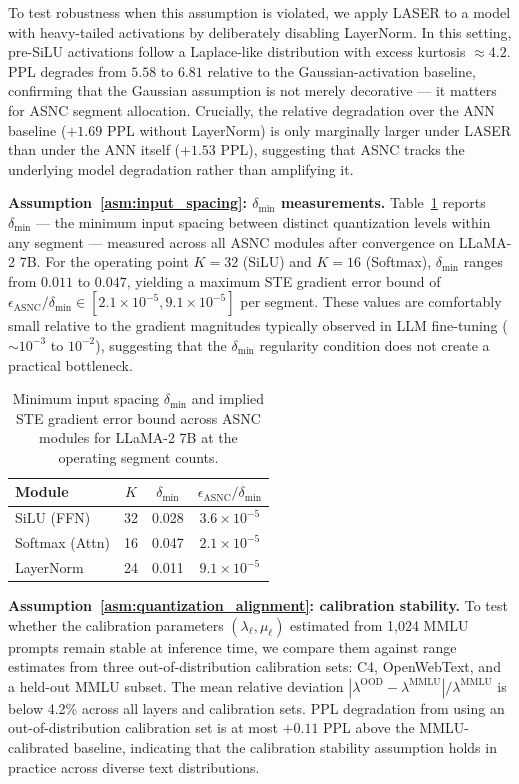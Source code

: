 \documentclass{article}
\theoremstyle{plain}
\theoremstyle{definition}
\theoremstyle{remark}
\begin{document}
To test robustness when this assumption is violated, we apply LASER to a model with
heavy-tailed activations by deliberately disabling LayerNorm. In this setting,
pre-SiLU activations follow a Laplace-like distribution with excess kurtosis
$\approx 4.2$. PPL degrades from $5.58$ to $6.81$ relative to the Gaussian-activation
baseline, confirming that the Gaussian assumption is not merely decorative — it
matters for ASNC segment allocation. Crucially, the relative degradation over the
ANN baseline ($+1.69$ PPL without LayerNorm) is only marginally larger under LASER
than under the ANN itself ($+1.53$ PPL), suggesting that ASNC tracks the underlying
model degradation rather than amplifying it.

\noindent\textbf{Assumption~\ref{asm:input_spacing}: $\delta_{\min}$ measurements.}
Table~\ref{tab:delta_min} reports $\delta_{\min}$ — the minimum input spacing
between distinct quantization levels within any segment — measured across all ASNC
modules after convergence on LLaMA-2 7B. For the operating point $K = 32$ (SiLU)
and $K = 16$ (Softmax), $\delta_{\min}$ ranges from $0.011$ to $0.047$, yielding
a maximum STE gradient error bound of $\epsilon_\mathrm{ASNC}/\delta_{\min} \in
[2.1 \times 10^{-5}, 9.1 \times 10^{-5}]$ per segment. These values are
comfortably small relative to the gradient magnitudes typically observed in
LLM fine-tuning ($\sim\!10^{-3}$ to $10^{-2}$), suggesting that the $\delta_{\min}$
regularity condition does not create a practical bottleneck.

\begin{table}[h!]
\centering
\caption{Minimum input spacing $\delta_{\min}$ and implied STE gradient error
bound across ASNC modules for LLaMA-2 7B at the operating segment counts.}
\label{tab:delta_min}
\small
\begin{tabular}{lccc}
\toprule
\textbf{Module} & $K$ & $\delta_{\min}$ & $\epsilon_{\mathrm{ASNC}}/\delta_{\min}$ \\
\midrule
SiLU (FFN)         & 32 & 0.028 & $3.6 \times 10^{-5}$ \\
Softmax (Attn)     & 16 & 0.047 & $2.1 \times 10^{-5}$ \\
LayerNorm          & 24 & 0.011 & $9.1 \times 10^{-5}$ \\
\bottomrule
\end{tabular}
\end{table}

\noindent\textbf{Assumption~\ref{asm:quantization_alignment}: calibration stability.}
To test whether the calibration parameters $(\lambda_\ell, \mu_\ell)$ estimated
from 1,024 MMLU prompts remain stable at inference time, we compare them against
range estimates from three out-of-distribution calibration sets: C4, OpenWebText,
and a held-out MMLU subset. The mean relative deviation $|\lambda^{\mathrm{OOD}} -
\lambda^{\mathrm{MMLU}}|/\lambda^{\mathrm{MMLU}}$ is below 4.2\% across all layers
and calibration sets. PPL degradation from using an out-of-distribution calibration
set is at most $+0.11$ PPL above the MMLU-calibrated baseline, indicating that the
calibration stability assumption holds in practice across diverse text distributions.
\end{document}
